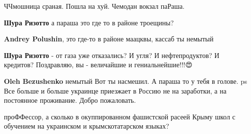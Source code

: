 \begin{itemize}


ЧЧмошница сраная. Пошла на хуй. Чемодан вокзал паРаша.

\begin{itemize}

\textbf{Шура Ризотто} а параша это где то в районе троещины?


\textbf{Andrey Polushin}, это где-то в районе маацквы, кассаб ты немытый


\textbf{Шура Ризотто} - от газа уже отказались? И угля? И нефтепродуктов? И кредитов? Поздравляю, вы - величайшие и гениальнейшие!!!😍


\textbf{Oleh Bezushenko} немытый \Smiley[1.0][yellow] Вот ты насмешил. А параша то у тебя в голове.
ps Все больше и больше украинце приезжает в Россию не на заработки, а на постоянное проживание. Добро пожаловать.
\end{itemize}


проФФессор, а сколько в окуппированном фашистской расеей Крыму школ с обучением
на украинском и крымскотатарском языках?

\end{itemize}

